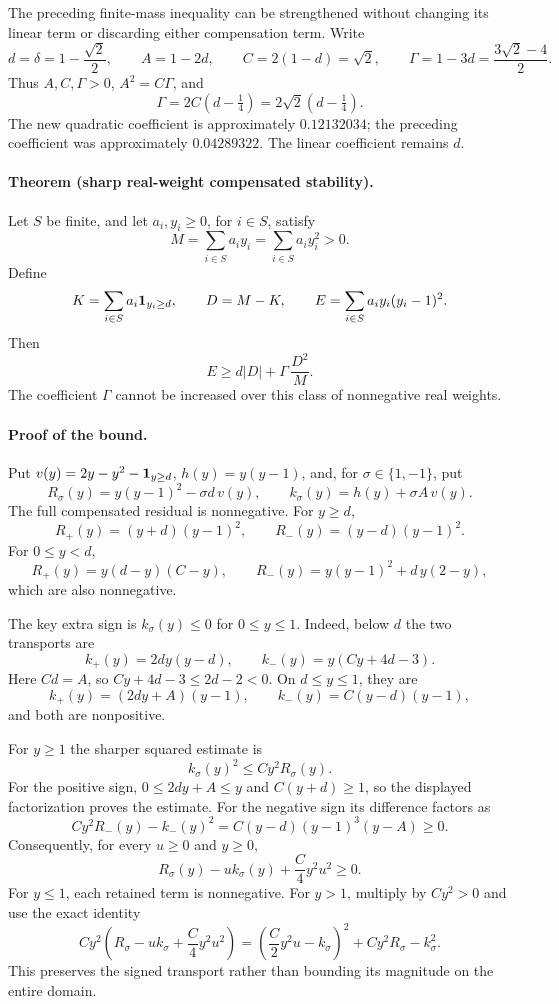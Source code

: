 The preceding finite-mass inequality can be strengthened without changing
its linear term or discarding either compensation term.  Write
\[
 d=\delta=1-\frac{\sqrt2}{2},\qquad A=1-2d,\qquad
 C=2(1-d)=\sqrt2,\qquad
 \Gamma=1-3d=\frac{3\sqrt2-4}{2}.
\]
Thus \(A,C,\Gamma>0\), \(A^2=C\Gamma\), and
\[
 \Gamma=2C(d-\tfrac14)=2\sqrt2(d-\tfrac14).
\]
The new quadratic coefficient is approximately \(0.12132034\);
the preceding coefficient was approximately \(0.04289322\).
The linear coefficient remains \(d\).

\paragraph{Theorem (sharp real-weight compensated stability).}
Let \(S\) be finite, and let \(a_i,y_i\ge0\), for \(i\in S\), satisfy
\[
 M=\sum_{i\in S}a_i y_i
   =\sum_{i\in S}a_i y_i^2>0.
\]
Define
\[
 K=\sum_{i\in S}a_i{\bf1}_{y_i\ge d},\qquad
 D=M-K,\qquad E=\sum_{i\in S}a_i y_i(y_i-1)^2.
\]
Then
\begin{equation}\label{eq:sharp-compensated-stability}
 E\ge d|D|+\Gamma\,\frac{D^2}{M}.
\end{equation}
The coefficient \(\Gamma\) cannot be increased over this class of
nonnegative real weights.

\paragraph{Proof of the bound.}
Put \(v(y)=2y-y^2-{\bf1}_{y\ge d}\), \(h(y)=y(y-1)\), and, for
\(\sigma\in\{1,-1\}\), put
\[
 R_\sigma(y)=y(y-1)^2-\sigma d\,v(y),\qquad
 k_\sigma(y)=h(y)+\sigma A\,v(y).
\]
The full compensated residual is nonnegative.  For \(y\ge d\),
\[
 R_+(y)=(y+d)(y-1)^2,\qquad
 R_-(y)=(y-d)(y-1)^2.
\]
For \(0\le y<d\),
\[
 R_+(y)=y(d-y)(C-y),\qquad
 R_-(y)=y(y-1)^2+d\,y(2-y),
\]
which are also nonnegative.

The key extra sign is \(k_\sigma(y)\le0\) for \(0\le y\le1\).
Indeed, below \(d\) the two transports are
\[
 k_+(y)=2dy(y-d),\qquad
 k_-(y)=y(Cy+4d-3).
\]
Here \(Cd=A\), so \(Cy+4d-3\le2d-2<0\).
On \(d\le y\le1\), they are
\[
 k_+(y)=(2dy+A)(y-1),\qquad
 k_-(y)=C(y-d)(y-1),
\]
and both are nonpositive.

For \(y\ge1\) the sharper squared estimate is
\begin{equation}\label{eq:sharp-transport-square}
 k_\sigma(y)^2\le Cy^2R_\sigma(y).
\end{equation}
For the positive sign, \(0\le2dy+A\le y\) and \(C(y+d)\ge1\),
so the displayed factorization proves the estimate.
For the negative sign its difference factors as
\[
 Cy^2R_-(y)-k_-(y)^2
   =C(y-d)(y-1)^3(y-A)\ge0.
\]
Consequently, for every \(u\ge0\) and \(y\ge0\),
\begin{equation}\label{eq:sharp-one-sided-packet}
 R_\sigma(y)-u k_\sigma(y)+\frac C4y^2u^2\ge0.
\end{equation}
For \(y\le1\), each retained term is nonnegative.
For \(y>1\), multiply by \(Cy^2>0\) and use the exact identity
\[
 Cy^2\left(R_\sigma-u k_\sigma+\frac C4y^2u^2\right)
 =\left(\frac C2y^2u-k_\sigma\right)^2
   +Cy^2R_\sigma-k_\sigma^2.
\]
This preserves the signed transport rather than bounding its magnitude
on the entire domain.

